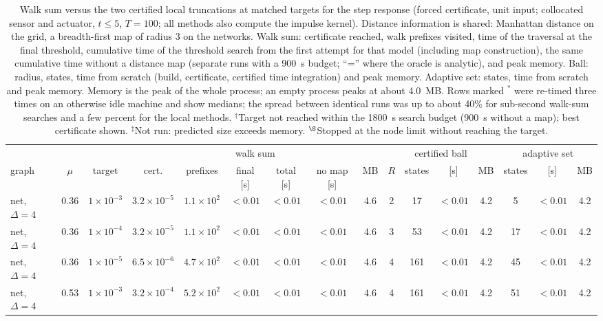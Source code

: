 \begin{table}[t]
\footnotesize\setlength{\tabcolsep}{1.35pt}
\caption{Walk sum versus the two certified local truncations at matched targets for the step response (forced certificate, unit input; collocated sensor and actuator, $t\le5$, $T=100$; all methods also compute the impulse kernel). Distance information is shared: Manhattan distance on the grid, a breadth-first map of radius 3 on the networks. Walk sum: certificate reached, walk prefixes visited, time of the traversal at the final threshold, cumulative time of the threshold search from the first attempt for that model (including map construction), the same cumulative time without a distance map (separate runs with a 900~s budget; ``='' where the oracle is analytic), and peak memory. Ball: radius, states, time from scratch (build, certificate, certified time integration) and peak memory. Adaptive set: states, time from scratch and peak memory. Memory is the peak of the whole process; an empty process peaks at about 4.0~MB. Rows marked $^*$ were re-timed three times on an otherwise idle machine and show medians; the spread between identical runs was up to about 40\% for sub-second walk-sum searches and a few percent for the local methods. $^\dagger$Target not reached within the 1800~s search budget (900~s without a map); best certificate shown. $^\ddagger$Not run: predicted size exceeds memory. $^\S$Stopped at the node limit without reaching the target.}\label{tab:crossover}
\begin{ruledtabular}
\begin{tabular}{lcc|cccccc|cccc|ccc}
 & & & \multicolumn{6}{c|}{walk sum} & \multicolumn{4}{c|}{certified ball} & \multicolumn{3}{c}{adaptive set}\\
graph & $\mu$ & target & cert. & prefixes & final [s] & total [s] & no map [s] & MB & $R$ & states & [s] & MB & states & [s] & MB\\\hline
net, $\Delta=4$ & 0.36 & $1\times10^{-3}$ & $3.2\times10^{-5}$ & $1.1\times10^{2}$ & $<0.01$ & $<0.01$ & $<0.01$ & 4.6 & 2 & 17 & $<0.01$ & 4.2 & 5 & $<0.01$ & 4.2 \\
net, $\Delta=4$ & 0.36 & $1\times10^{-4}$ & $3.2\times10^{-5}$ & $1.1\times10^{2}$ & $<0.01$ & $<0.01$ & $<0.01$ & 4.6 & 3 & 53 & $<0.01$ & 4.2 & 17 & $<0.01$ & 4.2 \\
net, $\Delta=4$ & 0.36 & $1\times10^{-5}$ & $6.5\times10^{-6}$ & $4.7\times10^{2}$ & $<0.01$ & $<0.01$ & $<0.01$ & 4.6 & 4 & 161 & $<0.01$ & 4.2 & 45 & $<0.01$ & 4.2 \\
net, $\Delta=4$ & 0.53 & $1\times10^{-3}$ & $3.2\times10^{-4}$ & $5.2\times10^{2}$ & $<0.01$ & $<0.01$ & $<0.01$ & 4.6 & 4 & 161 & $<0.01$ & 4.2 & 51 & $<0.01$ & 4.2 \\

\end{tabular}
\end{ruledtabular}
\end{table}
